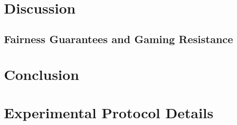 \documentclass[12pt]{article}
\begin{document}
\section{Discussion}


\subsection{Fairness Guarantees and Gaming Resistance}


\section{Conclusion}





\appendix

\section{Experimental Protocol Details}

\end{document}
